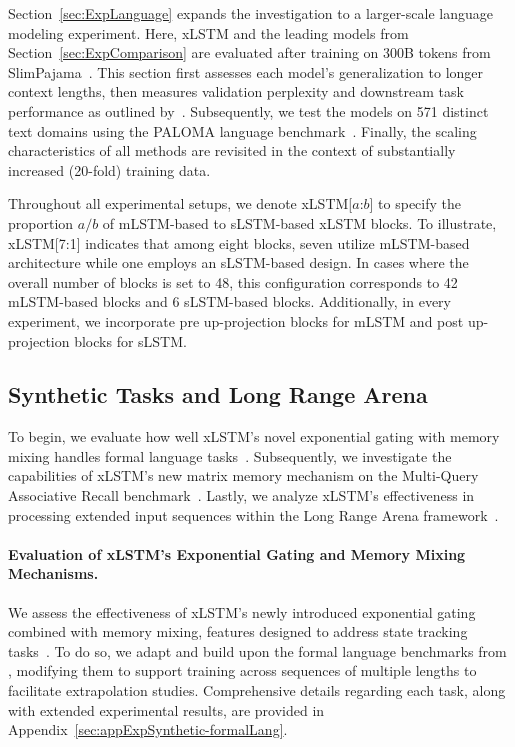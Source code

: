 Section~\ref{sec:ExpLanguage} expands the investigation to a larger-scale language modeling experiment. Here, xLSTM and the leading models from Section~\ref{sec:ExpComparison} are evaluated after training on 300B tokens from SlimPajama~\citep{Soboleva:23}. This section first assesses each model’s generalization to longer context lengths, then measures validation perplexity and downstream task performance as outlined by~\citep{Sutawika:24}. Subsequently, we test the models on 571 distinct text domains using the PALOMA language benchmark~\citep{Magnusson:23arxivshort}. Finally, the scaling characteristics of all methods are revisited in the context of substantially increased (20-fold) training data.

\label{sec:xlstm_blocks_notation}
Throughout all experimental setups, we denote xLSTM[$a$:$b$] to specify the proportion $a/b$ of mLSTM-based to sLSTM-based xLSTM blocks. To illustrate, xLSTM[7:1] indicates that among eight blocks, seven utilize mLSTM-based architecture while one employs an sLSTM-based design. In cases where the overall number of blocks is set to 48, this configuration corresponds to 42 mLSTM-based blocks and 6 sLSTM-based blocks. Additionally, in every experiment, we incorporate pre up-projection blocks for mLSTM and post up-projection blocks for sLSTM.

\subsection{Synthetic Tasks and Long Range Arena}
\label{sec:ExpSyntethic}
To begin, we evaluate how well xLSTM's novel exponential gating with memory mixing handles formal language tasks~\citep{Deletang:23}. Subsequently, we investigate the capabilities of xLSTM's new matrix memory mechanism on the Multi-Query Associative Recall benchmark~\citep{Arora:23arxiv}. Lastly, we analyze xLSTM's effectiveness in processing extended input sequences within the Long Range Arena framework~\citep{Tay:21}.

\paragraph{Evaluation of xLSTM's Exponential Gating and Memory Mixing Mechanisms.} We assess the effectiveness of xLSTM's newly introduced exponential gating combined with memory mixing, features designed to address state tracking tasks~\citep{Merrill:24, Merrill:23}. To do so, we adapt and build upon the formal language benchmarks from \citet{Deletang:23}, modifying them to support training across sequences of multiple lengths to facilitate extrapolation studies. Comprehensive details regarding each task, along with extended experimental results, are provided in Appendix~\ref{sec:appExpSynthetic-formalLang}. 

